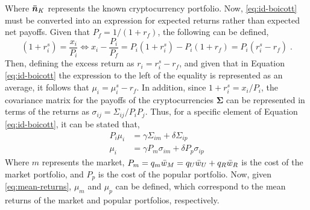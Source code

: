 Where $\bm{\Bar{n}}_K$ represents the known cryptocurrency portfolio. Now, \eqref{eq:id-boicott} must be converted into an expression for expected returns rather than expected net payoffs. Given that $P_f=1/(1+r_f)$, the following can be defined,
\begin{equation*}
	(1+r^{s}_{i}) = \frac{x_i}{P_i} \Leftrightarrow x_i - \frac{P_i}{P_f}=P_i(1+r^{s}_{i}) - P_i(1+r_f)=P_i(r^{s}_{i}-r_f)\;.
\end{equation*}
Then, defining the excess return as $r_i = r^{s}_{i} - r_{f}$, and given that in Equation \eqref{eq:id-boicott} the expression to the left of the equality is represented as an average, it follows that $\mu_{i} = \mu^{s}_{i} - r_{f}$. In addition, since $1 + r^{s}_{i} = x_i / P_i$, the covariance matrix for the payoffs of the cryptocurrencies $\bm{\Sigma}$ can be represented in terms of the returns as $\sigma_{ij} = \Sigma_{ij} / P_{i} P_{j}$. Thus, for a specific element of Equation \eqref{eq:id-boicott}, it can be stated that,
\begin{equation}
	\begin{split}
		P_i \mu_i&=\gamma \Sigma_{im} + \delta\Sigma_{ip}\\
		\mu_{i} &= \gamma P_m \sigma_{im} + \delta P_p \sigma_{ip}
	\end{split}
	\label{eq:mean-returns}
\end{equation}
Where $m$ represents the market, $P_m = q_m \Bar{w}_{M} = q_U \Bar{w}_{U} + q_R \Bar{w}_{R}$ is the cost of the market portfolio, and $P_p$ is the cost of the popular portfolio. Now, given \eqref{eq:mean-returns}, $\mu_{m}$ and $\mu_{p}$ can be defined, which correspond to the mean returns of the market and popular portfolios, respectively.



 